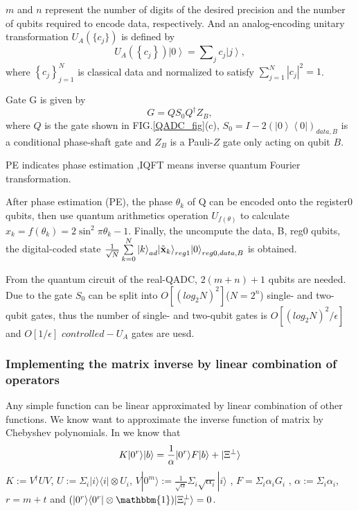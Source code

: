 \documentclass[%
 reprint,
 amsmath,amssymb,
pra,
]{revtex4-1}
\begin{document}
$m$ and $n$ represent the number of digits of the desired precision and the number of qubits required to encode data, respectively.
And an analog-encoding unitary transformation $U_A(\{c_j\})$ is defined by
\begin{equation}
U_A\left( {\left\{ {{c_j}} \right\}} \right)\left| 0 \right\rangle  = \sum\nolimits_j {{c_j}\left| j \right\rangle },
\end{equation}
where $\left\{ {{c_j}} \right\}_{j = 1}^N$ is classical data and normalized to satisfy $\sum\nolimits_{j = 1}^N {{{\left| {{c_j}} \right|}^2}}  = 1$.

Gate G is given by
\begin{equation}
G = Q{S_0}{Q^\dag }{Z_B},
\end{equation}
where $Q$ is the gate shown in FIG.\ref{QADC_fig}(c), ${S_0} = I - 2{\left( {\left| 0 \right\rangle \left\langle 0 \right|} \right)_{data,B}}$
is a conditional phase-shaft gate and ${Z_B}$ is a Pauli-$Z$ gate only acting on qubit $B$.

PE indicates phase estimation ,IQFT means inverse quantum Fourier transformation\cite{nielsen_quantum_2002}.

After phase estimation (PE), the phase ${\theta _k}$ of Q can be encoded onto the register0 qubits, then use quantum arithmetics operation ${U_{f\left( \theta  \right)}}$ to calculate
${x_k} = f\left( {{\theta _k}} \right) = 2{\sin ^2}\pi {\theta _k} - 1$.
Finally, the uncompute the data, B, reg0 qubits, the digital-coded state
$\frac{1}{{\sqrt N }}\sum\limits_{k = 0}^N {{{\left| k \right\rangle }_{ad}}{{\left| {{{\tilde {\textbf x}}_k}} \right\rangle }_{reg1}}{{\left| 0 \right\rangle }_{reg0,data,B}}} $
is obtained.


From the quantum circuit of the real-QADC, $2(m+n)+1$ qubits are needed. Due to the gate $S_0$ can be split into $O[(log_{2}N)^2]$($N=2^n$) 
single- and two-qubit gates\cite{barenco_elementary_1995}, thus the number of single- and two-qubit gates is $O[(log_{2}N)^2/{\epsilon}]$ and $O[1/{\epsilon}]$ $controlled-U_A$ gates are uesd\cite{mitarai2019quantum}.


\subsubsection{Implementing the matrix inverse by linear combination of operators}
Any simple function can be linear approximated by linear combination of other
functions. We know want to approximate the inverse function of matrix by
Chebyshev polynomials. In \cite{Childs2017Quantum} we know that 
\begin{equation}
\label{K}
K|0^r\rangle|b\rangle=\frac{1}{\alpha}|0^r\rangle F|b\rangle
+|\Xi^\bot \rangle\notag
\end{equation}
$K:=V^\dagger UV$, $U:=\Sigma_i|i\rangle\langle i|
\otimes U_i$, 
$V|0^m\rangle:=\frac{1}{\sqrt{\alpha}}\Sigma_i\sqrt{\alpha_i}|i\rangle$
, $F=\Sigma_i\alpha_iG_i$
, $\alpha:=\Sigma_i\alpha_i$, $r=m+t$ and 
$(|0^r\rangle\langle0^r|\otimes\mathbbm{1})|\Xi_i^\bot\rangle=0$.
\end{document}
